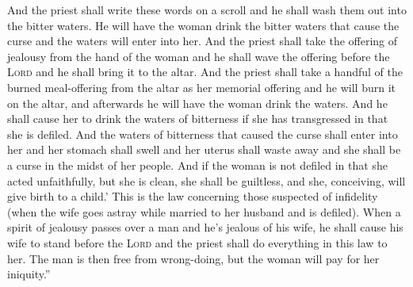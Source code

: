 \begin{inparaenum}
   And the priest shall write these words on a scroll and he shall wash them out into the bitter waters.%
   He will have the woman drink the bitter waters that cause the curse and the waters will enter into her.%
   And the priest shall take the offering of jealousy from the hand of the woman and he shall wave the offering before the \textsc{Lord} and he shall bring it to the altar.%
   And the priest shall take a handful of the burned meal-offering from the altar as her memorial offering and he will burn it on the altar, and afterwards he will have the woman drink the waters.%
   And he shall cause her to drink the waters of bitterness if she has transgressed in that she is defiled. And the waters of bitterness that caused the curse shall enter into her and her stomach shall swell and her uterus shall waste away and she shall be a curse in the midst of her people.%
   And if the woman is not defiled in that she acted unfaithfully, but she is clean, she shall be guiltless, and she, conceiving, will give birth to a child.'%
   This is the law concerning those suspected of infidelity (when the wife goes astray while married to her husband and is defiled).%
   When a spirit of jealousy passes over a man and he's jealous of his wife, he shall cause his wife to stand before the \textsc{Lord} and the priest shall do everything in this law to her.%
   The man is then free from wrong-doing, but the woman will pay for her iniquity.''%
\end{inparaenum}
